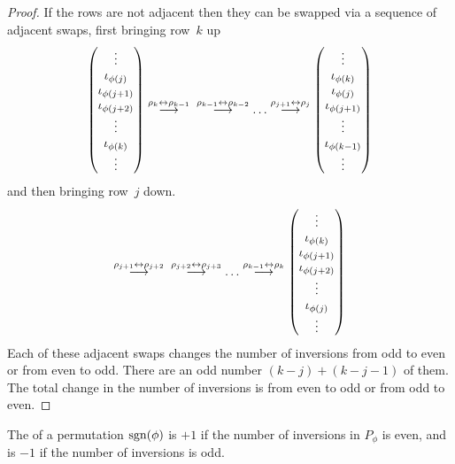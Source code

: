 \begin{proof}
If the rows are not adjacent then they can be swapped
via a sequence of adjacent swaps, first bringing row~$k$ up
\begin{equation*}
   \begin{pmatrix}
     \vdots             \\
     \iota_{\phi(j)}    \\
     \iota_{\phi(j+1)}  \\
     \iota_{\phi(j+2)}  \\
     \vdots             \\
     \iota_{\phi(k)}    \\
     \vdots
   \end{pmatrix}
  \mathrel{ \mathop{\longrightarrow}\limits^{\rho_k\leftrightarrow\rho_{k-1}\mathstrut}_{ \begin{subarray}{l} \relax \end{subarray}}}\;\;
  \mathrel{ \mathop{\longrightarrow}\limits^{\rho_{k-1}\leftrightarrow\rho_{k-2}\mathstrut}_{ \begin{subarray}{l} \relax \end{subarray}}}
  \dots
  \mathrel{ \mathop{\longrightarrow}\limits^{\rho_{j+1}\leftrightarrow\rho_j\mathstrut}_{ \begin{subarray}{l} \relax \end{subarray}}}
   \begin{pmatrix}
     \vdots             \\
     \iota_{\phi(k)}    \\
     \iota_{\phi(j)}    \\
     \iota_{\phi(j+1)}  \\
     \vdots             \\
     \iota_{\phi(k-1)}  \\
     \vdots
   \end{pmatrix}
\end{equation*}
and then bringing row~$j$ down.
\begin{equation*}
  \mathrel{ \mathop{\longrightarrow}\limits^{\rho_{j+1}\leftrightarrow\rho_{j+2}\mathstrut}_{ \begin{subarray}{l} \relax \end{subarray}}}\;\;
  \mathrel{ \mathop{\longrightarrow}\limits^{\rho_{j+2}\leftrightarrow\rho_{j+3}\mathstrut}_{ \begin{subarray}{l} \relax \end{subarray}}}
  \dots
  \mathrel{ \mathop{\longrightarrow}\limits^{\rho_{k-1}\leftrightarrow\rho_k\mathstrut}_{ \begin{subarray}{l} \relax \end{subarray}}}
   \begin{pmatrix}
     \vdots             \\
     \iota_{\phi(k)}    \\
     \iota_{\phi(j+1)}  \\
     \iota_{\phi(j+2)}  \\
     \vdots             \\
     \iota_{\phi(j)}    \\
     \vdots
   \end{pmatrix}
\end{equation*}
Each of these adjacent swaps changes the number of 
inversions from odd to even or from even to odd.
There are an odd number \( (k-j)+(k-j-1) \) of them.
The total change in the number of inversions 
is from even to odd or from odd to even.
\end{proof}

\begin{definition}
The %
of a permutation \( \operatorname{sgn}(\phi) \)
is \( +1 \) if the number of inversions in \( P_\phi \) is even, and is
\( -1 \) if the number of inversions is odd.
\end{definition}

